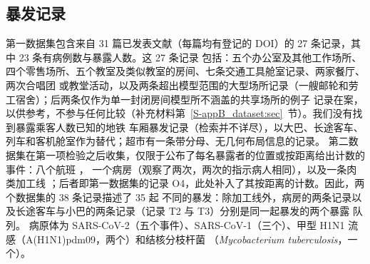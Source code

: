 \subsection{暴发记录}\label{s8_outbreaks:sec:dataset}

第一数据集包含来自 31 篇已发表文献（每篇均有登记的 DOI）的 27 条记录，其中 23 条有病例数与暴露人数。这 27 条记录
包括：五个办公室及其他工作场所、四个零售场所、五个教室及类似教室的房间、七条交通工具舱室记录、两家餐厅、两次合唱团
或教堂活动，以及两条超出模型范围的大型场所记录（一艘邮轮和劳工宿舍）；后两条仅作为单一封闭房间模型所不涵盖的共享场所的例子
记录在案，以供参考，不参与任何比较（补充材料第~\ref{S-appB_dataset:sec}~节）。我们没有找到暴露乘客人数已知的地铁
车厢暴发记录（检索并不详尽），以大巴、长途客车、列车和客机舱室作为替代；超市有一条带分母、无几何布局信息的记录。
第二数据集在第一项检验之后收集，仅限于公布了每名暴露者的位置或按距离给出计数的事件：八个航班
\citep{olsen2003transmission,kenyon1996transmission,baker2010transmission,young2014international,toyokawa2022transmission,speake2020flight,swadi2021genomic,hoehl2020assessment}，
一个病房（观察了两次，两次的指示病人相同）\citep{wong2004cluster,yu2005temporal}，以及一条肉类加工线
\citep{guenther2020}；后者即第一数据集的记录 O4，此处补入了其按距离的计数。因此，两个数据集的 38 条记录描述了 35 起
不同的暴发：除加工线外，病房的两条记录以及长途客车与小巴的两条记录（记录 T2 与 T3）分别是同一起暴发的两个暴露
队列。
病原体为 SARS-CoV-2（五个事件）、SARS-CoV-1（三个）、甲型 H1N1 流感（A(H1N1)pdm09，两个）和结核分枝杆菌
（\emph{Mycobacterium tuberculosis}，一个）。

